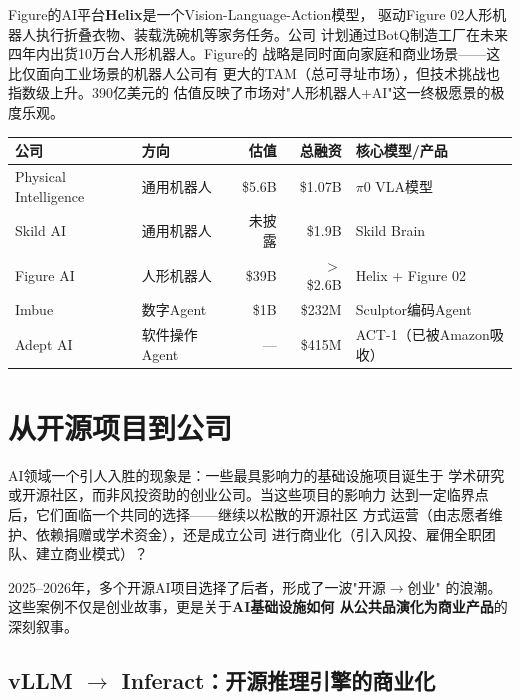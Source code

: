 Figure的AI平台\textbf{Helix}是一个Vision-Language-Action模型，
驱动Figure 02人形机器人执行折叠衣物、装载洗碗机等家务任务。公司
计划通过BotQ制造工厂在未来四年内出货10万台人形机器人。Figure的
战略是同时面向家庭和商业场景——这比仅面向工业场景的机器人公司有
更大的TAM（总可寻址市场），但技术挑战也指数级上升。390亿美元的
估值反映了市场对"人形机器人+AI"这一终极愿景的极度乐观。

\begin{keybox}
\small
\begin{tabularx}{\textwidth}{l l r r X}
\toprule
\rowcolor{figLightGray}
\textbf{公司} & \textbf{方向} & \textbf{估值} & \textbf{总融资} & \textbf{核心模型/产品} \\
\midrule
Physical Intelligence & 通用机器人    & \$5.6B  & \$1.07B & $\pi$0 VLA模型 \\
Skild AI             & 通用机器人    & 未披露  & \$1.9B  & Skild Brain \\
Figure AI            & 人形机器人    & \$39B   & $>$\$2.6B & Helix + Figure 02 \\
Imbue                & 数字Agent     & \$1B    & \$232M  & Sculptor编码Agent \\
Adept AI             & 软件操作Agent & ---     & \$415M  & ACT-1（已被Amazon吸收） \\
\bottomrule
\end{tabularx}
\end{keybox}


\section{从开源项目到公司}
\label{sec:models-oss-to-company}

AI领域一个引人入胜的现象是：一些最具影响力的基础设施项目诞生于
学术研究或开源社区，而非风投资助的创业公司。当这些项目的影响力
达到一定临界点后，它们面临一个共同的选择——继续以松散的开源社区
方式运营（由志愿者维护、依赖捐赠或学术资金），还是成立公司
进行商业化（引入风投、雇佣全职团队、建立商业模式）？

2025--2026年，多个开源AI项目选择了后者，形成了一波"开源$\to$创业"
的浪潮。这些案例不仅是创业故事，更是关于\textbf{AI基础设施如何
从公共品演化为商业产品}的深刻叙事。

\subsection{vLLM $\to$ Inferact：开源推理引擎的商业化}
\label{subsec:vllm-inferact}

